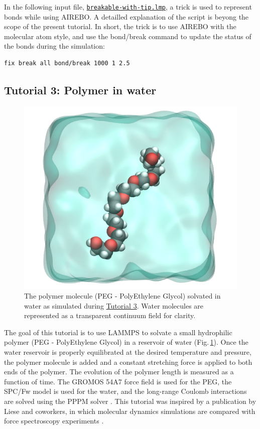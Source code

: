 \documentclass[9pt,tutorial]{livecoms}
\newcommand{\lmpcmd}[1]{\hspace{0pt}\colorbox{listing}{\textcolor{command}{\small{#1}}}\hspace{0pt}} %
\newcommand{\dwlcmd}[1]{\textcolor{download}{\texttt{#1}}} %
\newcommand{\filepath}{https://raw.githubusercontent.com/lammpstutorials/lammpstutorials-article/main/files/}
\begin{document}
In the following input file,
\href{\filepath tutorial2/breakable-with-tip.lmp}{\dwlcmd{breakable-with-tip.lmp}},
a trick is used to represent bonds while using AIREBO.  A detailled
explanation of the script is beyong the scope of the present tutorial.
In short, the trick is to use AIREBO with the molecular atom
style, and use the \lmpcmd{bond/break} command to update the status of the bonds
during the simulation:
\begin{lstlisting}
fix break all bond/break 1000 1 2.5
\end{lstlisting}

\subsection{Tutorial 3: Polymer in water}
\label{all-atoms-label}

\begin{figure}
\centering
\includegraphics[width=0.55\linewidth]{PEG}
\caption{The polymer molecule (PEG - PolyEthylene Glycol) solvated in water as
simulated during \hyperref[all-atoms-label]{Tutorial 3}.  Water molecules are
represented as a transparent continuum field for clarity.}
\label{fig:PEG}
\end{figure}

\noindent The goal of this tutorial is to use LAMMPS to solvate a small hydrophilic
polymer (PEG - PolyEthylene Glycol) in a reservoir of water (Fig.\,\ref{fig:PEG}).
Once the water reservoir is properly equilibrated at the desired temperature and
pressure, the polymer molecule is added and a constant stretching force is applied
to both ends of the polymer.  The evolution of the polymer length is measured as
a function of time.  The GROMOS 54A7 force field \cite{schmid2011definition} is used
for the PEG, the SPC/Fw model \cite{wu2006flexible} is used for the water, and the
long-range Coulomb interactions are solved using the PPPM solver \cite{luty1996calculating}.
This tutorial was inspired by a publication by Liese and coworkers, in which molecular
dynamics simulations are compared with force spectroscopy experiments \cite{liese2017hydration}.
\end{document}
